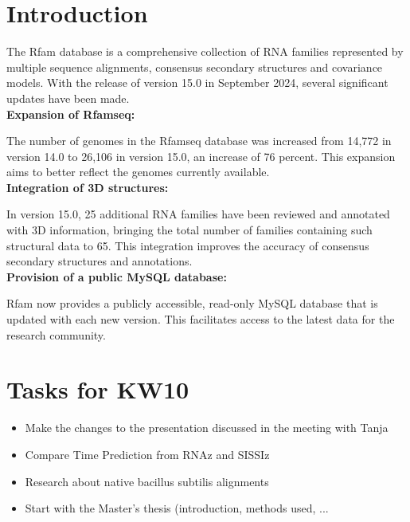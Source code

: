 \documentclass{article}
\begin{document}
\begin{large}
\begin{large}
\begin{large}
\section{Introduction}\par
The Rfam database is a comprehensive collection of RNA families represented by multiple sequence alignments, consensus secondary structures and covariance models. With the release of version 15.0 in September 2024, several significant updates have been made.\\[0.5em]

\textbf{Expansion of Rfamseq:}\par
The number of genomes in the Rfamseq database was increased from 14,772 in version 14.0 to 26,106 in version 15.0, an increase of 76 percent. This expansion aims to better reflect the genomes currently available.\\[0.5em]

\textbf{Integration of 3D structures:}\par
 In version 15.0, 25 additional RNA families have been reviewed and annotated with 3D information, bringing the total number of families containing such structural data to 65. This integration improves the accuracy of consensus secondary structures and annotations.\\[0.5em]

\textbf{Provision of a public MySQL database:}\par
Rfam now provides a publicly accessible, read-only MySQL database that is updated with each new version. This facilitates access to the latest data for the research community.\\[0.5em]

\section{Tasks for KW10}
\begin{itemize}
    \item Make the changes to the presentation discussed in the meeting with Tanja
    \item Compare Time Prediction from RNAz and SISSIz
    \item Research about native bacillus subtilis alignments
    \item Start with the Master's thesis (introduction, methods used, ...
\end{itemize}


\end{large}
\end{large}
\end{large}
\end{document}
